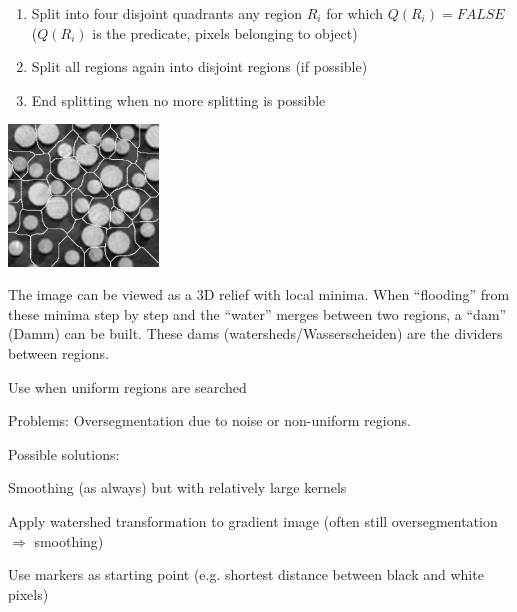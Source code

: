       \begin{enumerate}
      	\item Split into four disjoint quadrants any region $R_i$ for which $Q(R_i)=FALSE$ ($Q(R_i)$ 
      	  is the predicate, pixels belonging to object)
      	\item Split all regions again into disjoint regions (if possible)
      	\item End splitting when no more splitting is possible
      \end{enumerate}
    
    \begin{minipage}{4cm}
      \includegraphics[width=4cm]{./images/morphology_watersheds.png}
    \end{minipage}
    \hspace{0.5cm}
    \begin{minipage}{14.5cm}
      The image can be viewed as a 3D relief with local minima. When ``flooding'' from these minima
      step by step and the ``water'' merges between two regions, a ``dam'' (Damm) can be built. These
      dams (watersheds/Wasserscheiden) are the dividers between regions.
      \begin{liste}
      	\item Use when uniform regions are searched
      	\item Problems: Oversegmentation due to noise or non-uniform regions.
      	\item Possible solutions:
          \begin{liste}
          	\item Smoothing (as always) but with relatively large kernels
          	\item Apply watershed transformation to gradient image (often still oversegmentation $\Rightarrow$ smoothing)
          	\item Use markers as starting point (e.g. shortest distance between black and white pixels)
          \end{liste}
      \end{liste}
    \end{minipage}
      
      